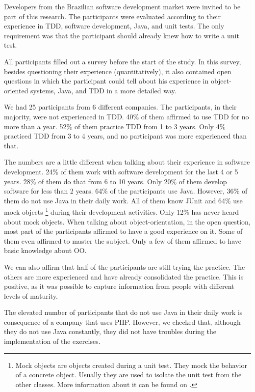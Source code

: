 \documentclass[conference]{IEEEtran}
\begin{document}
Developers from the Brazilian software development market were invited to be part
of this research. The participants were evaluated according to their experience in TDD,
software development, Java, and unit tests. The only requirement was that the participant
should already knew how to write a unit test.

All participants filled out a survey before the start of the study. In this survey,
besides questioning their experience (quantitatively), it also contained open questions in which
the participant could tell about his experience in object-oriented systems, Java, and
TDD in a more detailed way.

We had 25 participants from 6 different companies. The participants, in their majority,
were not experienced in TDD. 40\% of them affirmed to use TDD for no more than a year.
52\% of them practice TDD from 1 to 3 years. Only 4\% practiced TDD from 3 to 4
years, and no participant was more experienced than that.

The numbers are a little different when talking about their experience in software
development. 24\% of them work with software development for the last 4 or 5 years.
28\% of them do that from 6 to 10 years. Only 20\% of them develop software for less
than 2 years. 64\% of the participants use Java. However, 36\% of them do not use
Java in their daily work. All of them know JUnit and 64\% use mock objects 
\footnote{Mock objects are objects created during a unit test. They mock the behavior 
of a concrete object. Usually they are used to isolate the unit test from the other classes. 
More information about it can be found on \cite{mocks}.}
during their development activities.
Only 12\% has never heard about mock objects. When talking about object-orientation,
in the open question, most part of the participants affirmed to have a good experience
on it. Some of them even affirmed to master the subject. Only a few of them affirmed
to have basic knowledge about OO.

We can also affirm that half of the participants are still trying the practice. The others
are more experienced and have already consolidated the practice. This is positive, as it
was possible to capture information from people with different levels of maturity.

The elevated number of participants that do not use Java in their daily work is consequence
of a company that uses PHP. However, we checked that, although they do not use Java constantly,
they did not have troubles during the implementation of the exercises.
\end{document}
